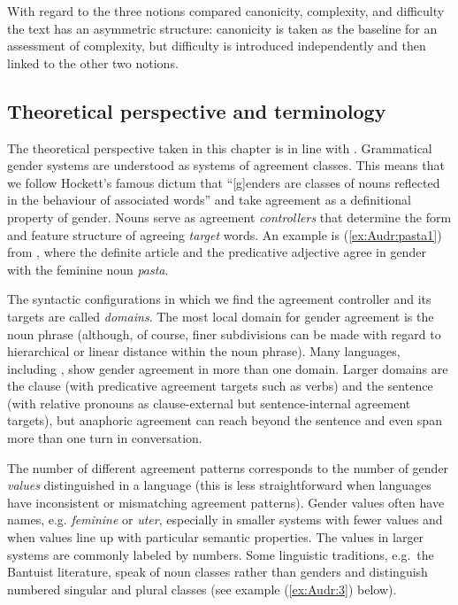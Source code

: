 \documentclass[output=collectionpaper]{langsci/langscibook}
\begin{document}
With regard to the three notions compared \textendash{} canonicity, com\-plex\-i\-ty, and dif\-fi\-cul\-ty \textendash{} the text has an asymmetric structure: canonicity is taken as the baseline for an assessment of complexity, but difficulty is introduced independently and then linked to the other two notions.

\subsection{Theoretical perspective and terminology}
\label{sec:Audr:1.2}
The theoretical perspective taken in this chapter is in line with \citet{Corbett1991,Corbett2013,Corbett2013a,Corbett2013b}. Grammatical gender systems are understood as systems of agreement classes. This means that we follow Hockett's famous dictum that ``[g]enders are classes of nouns reflected in the behaviour of associated words'' \citep[231]{Hockett1958} and take agreement as a definitional property of gender. Nouns serve as agreement \textit{controllers} that determine the form and feature structure of agreeing \textit{target} words. An example is (\ref{ex:Audr:pasta1}) from , where the definite article and the predicative adjective agree in gender with the feminine noun \textit{pasta}.

%

The syntactic configurations in which we find the agreement controller and its targets are called \textit{domains}. The most local domain for gender agreement is the noun phrase (although, of course, finer subdivisions can be made with regard to hierarchical or linear distance within the noun phrase). Many languages, including , show gender agreement in more than one domain. Larger domains are the clause (with predicative agreement targets such as verbs) and the sentence (with relative pronouns as clause-external but sentence-internal agreement targets), but anaphoric agreement can reach beyond the sentence and even span more than one turn in conversation.

The number of different agreement patterns corresponds to the number of gender \textit{values} distinguished in a language (this is less straightforward when languages have inconsistent or mismatching agreement patterns). Gender values often have names, e.g. \textit{feminine} or \textit{uter}, especially in smaller systems with fewer values and when values line up with particular semantic properties. The values in larger systems are commonly labeled by numbers. Some linguistic traditions, e.g.\ the Bantuist literature, speak of noun classes rather than genders and distinguish numbered singular and plural classes (see example (\ref{ex:Audr:3}) below).
\end{document}
